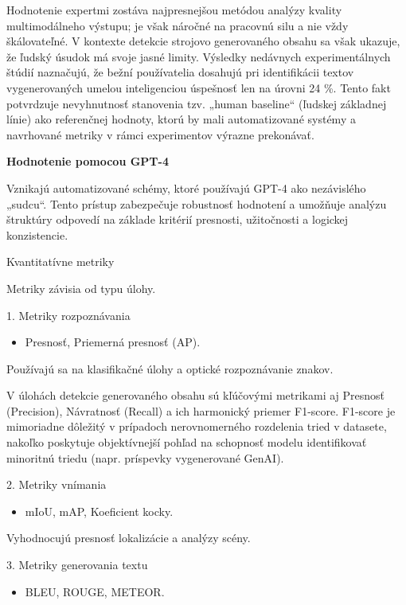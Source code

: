 \documentclass[]{tukediphc}
\begin{document}
Hodnotenie expertmi zostáva najpresnejšou metódou analýzy kvality multimodálneho výstupu; je však náročné na pracovnú silu a nie vždy škálovateľné. V kontexte detekcie strojovo generovaného obsahu sa však ukazuje, že ľudský úsudok má svoje jasné limity. Výsledky nedávnych experimentálnych štúdií naznačujú, že bežní používatelia dosahujú pri identifikácii textov vygenerovaných umelou inteligenciou úspešnosť len na úrovni 24 \%. Tento fakt potvrdzuje nevyhnutnosť stanovenia tzv. „human baseline“ (ľudskej základnej línie) ako referenčnej hodnoty, ktorú by mali automatizované systémy a navrhované metriky v rámci experimentov výrazne prekonávať\cite{Detecting_Artificial_Intelligence_Generated_Text_from_Human-Written_Text}.

\textbf{Hodnotenie pomocou GPT-4}

Vznikajú automatizované schémy, ktoré používajú GPT-4 ako nezávislého „sudcu“. Tento prístup zabezpečuje robustnosť hodnotení a umožňuje analýzu štruktúry odpovedí na základe kritérií presnosti, užitočnosti a logickej konzistencie.

Kvantitatívne metriky

Metriky závisia od typu úlohy.

1. Metriky rozpoznávania
\begin{itemize}
\item Presnosť, Priemerná presnosť (AP).
\end{itemize}

Používajú sa na klasifikačné úlohy a optické rozpoznávanie znakov.

V úlohách detekcie generovaného obsahu sú kľúčovými metrikami aj Presnosť (Precision), Návratnosť (Recall) a ich harmonický priemer F1-score. F1-score je mimoriadne dôležitý v prípadoch nerovnomerného rozdelenia tried v datasete, nakoľko poskytuje objektívnejší pohľad na schopnosť modelu identifikovať minoritnú triedu (napr. príspevky vygenerované GenAI).

2. Metriky vnímania

\begin{itemize}
\item mIoU, mAP, Koeficient kocky.
\end{itemize}

Vyhodnocujú presnosť lokalizácie a analýzy scény.

3. Metriky generovania textu

\begin{itemize}
\item BLEU, ROUGE, METEOR.
\end{itemize}
\end{document}
